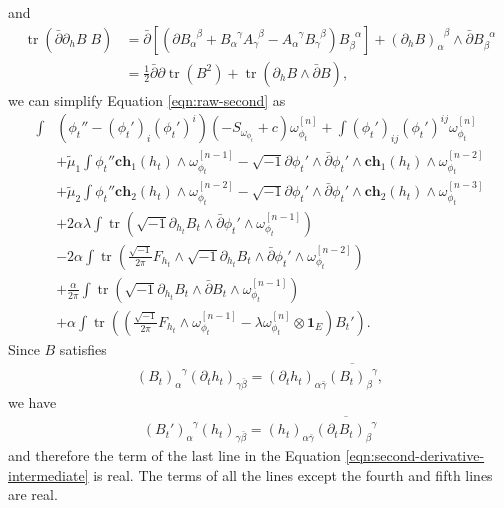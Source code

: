 \documentclass[10pt, letterpaper]{amsart}
\newcommand{\tr}{\operatorname{tr}}
\theoremstyle{plain}
\theoremstyle{definition}
\numberwithin{equation}{section}
\begin{document}
and
\begin{align*}
   \tr\left( \bar\partial \partial_h B\; B\right)
   &=
   \bar\partial \left[ \left(\partial B_\alpha^{\phantom{\alpha}\beta} + B_\alpha^{\phantom{\alpha}\gamma}A_\gamma^{\phantom{\gamma}\beta}- A_\alpha^{\phantom{\alpha}\gamma}B_\gamma^{\phantom{\gamma}\beta}\right) B_\beta^{\phantom{\beta}\alpha}\right]
   + 
   \left(\partial_h B\right)_\alpha^{\phantom{\alpha}\beta}\wedge \bar\partial B_\beta^{\phantom{\beta}\alpha}\\
   & = 
   \frac{1}{2}\bar\partial \partial \tr \left(B^2\right) 
   + 
   \tr \left( \partial_h B\wedge \bar\partial B\right),
\end{align*}
we can simplify Equation \eqref{eqn:raw-second} as
\begin{equation}
\label{eqn:second-derivative-intermediate}
\begin{split}
\int 
& \left( \phi_t''-\left(\phi_t'\right)_i\left(\phi_t'\right)^i\right)\left(-S_{\omega_{\phi_t}} +c\right) \omega_{\phi_t}^{[n]} 
+ 
\int \left(\phi_t'\right)_{ij}\left(\phi_t'\right)^{ij}\omega_{\phi_t}^{[n]} \\
& 
+ \widetilde\mu_1 \int \phi_t'' \mathbf{ch}_1\left(h_t\right)\wedge \omega_{\phi_t}^{[n-1]} 
- 
\sqrt{-1}\partial\phi_t'\wedge \bar\partial \phi_t'\wedge \mathbf{ch}_1\left(h_t\right)\wedge \omega_{\phi_t}^{[n-2]}\\
& + 
\widetilde\mu_2 \int \phi_t'' \mathbf{ch}_2\left(h_t\right) \wedge\omega_{\phi_t}^{[n-2]} 
- 
\sqrt{-1}\partial\phi_t'\wedge \bar\partial \phi_t'\wedge \mathbf{ch}_2\left(h_t\right)\wedge \omega_{\phi_t}^{[n-3]}\\
& 
+ 
2\alpha \lambda \int \tr \left(\sqrt{-1}\partial_{h_t}B_t\wedge \bar\partial \phi_t'\wedge \omega_{\phi_t}^{[n-1]}\right) \\
& 
-2\alpha \int \tr \left(\frac{\sqrt{-1}}{2\pi}F_{h_t}\wedge \sqrt{-1}\partial_{h_t}B_t\wedge \bar\partial \phi_t' \wedge \omega_{\phi_t}^{[n-2]}\right)\\
& 
+ \frac{\alpha}{2\pi}\int \tr \left( \sqrt{-1}\partial_{h_t}B_t\wedge \bar\partial B_t\wedge \omega_{\phi_t}^{[n-1]}\right)\\
& + 
\alpha \int \tr \left(\left( \frac{\sqrt{-1}}{2\pi}F_{h_t}\wedge \omega_{\phi_t}^{[n-1]} - \lambda \omega_{\phi_t}^{[n]}\otimes \mathbf{1}_E\right) B_t'\right).
\end{split}
\end{equation}
Since $B$ satisfies
\begin{align*}
    \left(B_t\right)_\alpha^{\phantom{\alpha}\gamma}\left(\partial_t h_t\right)_{\gamma\bar\beta}
    = 
    \left(\partial_t h_t\right)_{\alpha\bar\gamma}\overline{\left(B_t\right)_\beta^{\phantom{\beta}\gamma}}, 
\end{align*}
we have 
\begin{align*}
    \left(B_t'\right)_\alpha^{\phantom{\alpha}\gamma}\left(h_t\right)_{\gamma\bar\beta}
    = 
    \left(h_t\right)_{\alpha\bar\gamma}\overline{\left(\partial_t B_t\right)_\beta^{\phantom{\beta}\gamma}}
\end{align*}
and therefore the term of the last line in the Equation \eqref{eqn:second-derivative-intermediate} is real. The terms of all the lines except the fourth and fifth lines are real. 
\end{document}

